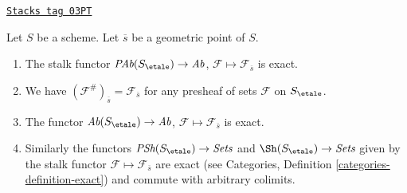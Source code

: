 \begin{lemma}
\label{etale-cohomology-lemma-stalk-exact}
\href{https://stacks.math.columbia.edu/tag/03PT}{\texttt{Stacks tag 03PT}}

Let $S$ be a scheme. Let $\overline{s}$ be a geometric point of $S$.
\begin{enumerate}
\item The stalk functor
$\textit{PAb}(S_\etale) \to \textit{Ab}$,
$\mathcal{F}  \mapsto  \mathcal{F}_{\overline{s}}$
is exact.
\item We have $(\mathcal{F}^\#)_{\overline{s}} = \mathcal{F}_{\overline{s}}$
for any presheaf of sets $\mathcal{F}$ on $S_\etale$.
\item The functor
$\textit{Ab}(S_\etale) \to \textit{Ab}$,
$\mathcal{F} \mapsto \mathcal{F}_{\overline{s}}$ is exact.
\item Similarly the functors
$\textit{PSh}(S_\etale) \to \textit{Sets}$ and
$\Sh(S_\etale) \to \textit{Sets}$ given by the stalk functor
$\mathcal{F} \mapsto \mathcal{F}_{\overline{s}}$ are exact (see
Categories, Definition \ref{categories-definition-exact})
and commute with arbitrary colimits.
\end{enumerate}
\end{lemma}

